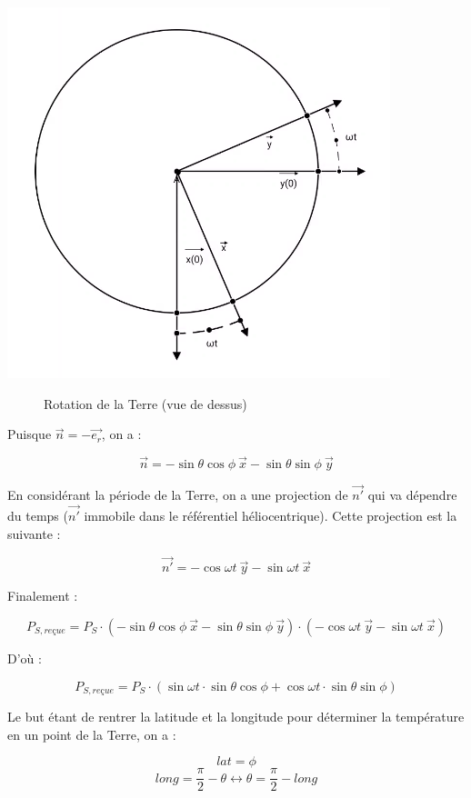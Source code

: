 \documentclass[a4paper,11pt]{article}
\begin{document}
\begin{adjustbox}{center}
\includegraphics[scale=0.5]{projete_omega_t}
\end{adjustbox}
\begin{figure}[h]
  \centering
  \caption{Rotation de la Terre (vue de dessus)}
\end{figure}

Puisque $ \vec{n} = -\overrightarrow{e_r}$, on a :

\[ \vec{n} = - \sin \theta \cos \phi ~ \vec{x} - \sin \theta \sin \phi ~ \vec{y} \]

En considérant la période de la Terre, on a une projection de $\vec{n'}$ qui va dépendre du temps ($\vec{n'}$ immobile dans le référentiel héliocentrique). Cette projection est la suivante :

\[ \vec{n'} = - \cos \omega t ~ \vec{y} - \sin \omega t ~ \vec{x} \]

Finalement :

\[ P_{S,reçue} = P_S \cdot (- \sin \theta \cos \phi ~ \vec{x} - \sin \theta \sin \phi ~ \vec{y}) \cdot (- \cos \omega t ~ \vec{y} - \sin \omega t ~ \vec{x}) \]

D'où :

\[ P_{S,reçue} = P_S \cdot (\sin \omega t \cdot \sin \theta \cos \phi + \cos \omega t \cdot \sin \theta \sin \phi) \]

Le but étant de rentrer la latitude et la longitude pour déterminer la température en un point de la Terre, on a :

\[ lat = \phi \]
\[ long = \dfrac{\pi}{2} - \theta \leftrightarrow \theta = \dfrac{\pi}{2} - long \]
\end{document}
